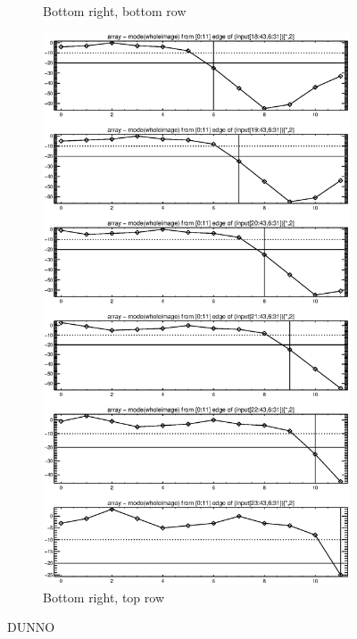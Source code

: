 \documentclass[10pt]{article}
\begin{document}
\begin{figure}[!h]
\begin{subfigure}[b]{.4\linewidth}
        \caption{Bottom right, bottom row}
    \end{subfigure}
    \hspace{1.0in}
    \begin{subfigure}[b]{.4\linewidth}
        \centering
        \includegraphics[width=1.4\textwidth]{plots_tables_images/botright1.eps} 
        \caption{Bottom right, top row}
    \end{subfigure}
    \caption{DUNNO}
\end{figure}
\end{document}
